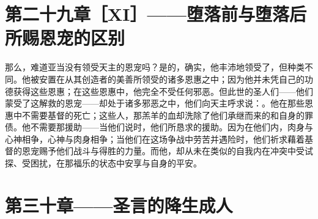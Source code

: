 
\section{第二十九章［XI］——堕落前与堕落后所赐恩宠的区别}

那么，难道亚当没有领受天主的恩宠吗？是的，确实，他丰沛地领受了，但种类不同。他被安置在从其创造者的美善所领受的诸多恩惠之中；因为他并未凭自己的功德获得这些恩惠；在这些恩惠中，他完全不受任何邪恶。但此世的圣人们——他们蒙受了这解救的恩宠——却处于诸多邪恶之中，他们向天主呼求说：。他在那些恩惠中不需要基督的死亡；这些人，那羔羊的血却洗除了他们承继而来的和自身的罪债。他不需要那援助——当他们说时，他们所恳求的援助。因为在他们内，肉身与心神相争，心神与肉身相争；当他们在这场争战中劳苦并遇险时，他们祈求藉着基督的恩宠赐予他们战斗与得胜的力量。而他，却从未在类似的自我内在冲突中受试探、受困扰，在那福乐的状态中安享与自身的平安。\par


\section{第三十章——圣言的降生成人}

